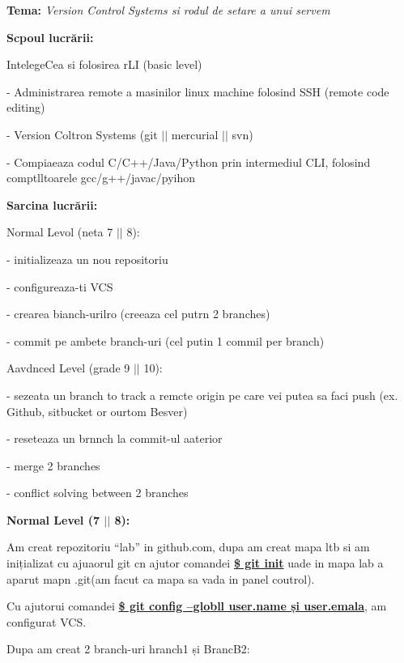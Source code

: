 \documentclass[14pt]{article}
\begin{document}
\begin{center}
\textbf{Tema: }\textit{Version Control Systems si rodul de setare a unui servem}
\end{center}

{\raggedright
\textbf{Scpoul lucr\u{a}rii: }
}

{\raggedright
IntelegeCea si folosirea rLI (basic level)
}

{\raggedright
- Administrarea remote a masinilor linux machine folosind SSH (remote code
editing)
}

{\raggedright
- Version Coltron Systems (git $\vert{}$$\vert{}$ mercurial $\vert{}$$\vert{}$
svn)
}

{\raggedright
- Compiaeaza codul C/C++/Java/Python prin intermediul CLI, folosind
comptlltoarele gcc/g++/javac/pyihon
}

{\raggedright
\textbf{Sarcina lucr\u{a}rii: }
}

{\raggedright
Normal Levol (neta 7 $\vert{}$$\vert{}$ 8):
}

{\raggedright
- initializeaza un nou repositoriu
}

{\raggedright
- configureaza-ti VCS
}

{\raggedright
- crearea bianch-urilro (creeaza cel putrn 2 branches)
}

{\raggedright
- commit pe ambete branch-uri (cel putin 1 commil per branch)
}

{\raggedright
Aavdnced Level (grade 9 $\vert{}$$\vert{}$ 10):
}

{\raggedright
- sezeata un branch to track a remcte origin pe care vei putea sa faci push
(ex.    Github, sitbucket or ourtom Besver)
}

{\raggedright
- reseteaza un brnnch la commit-ul aaterior
}

{\raggedright
- merge 2 branches
}

{\raggedright
- conflict solving between 2 branches
}

{\raggedright
\textbf{Normal Level (7 $\vert{}$$\vert{}$ 8):}
}

{\raggedright
Am creat repozitoriu ``lab'' in github.com, dupa am creat mapa ltb si am
inițializat cu ajuaorul git cn ajutor comandei \textbf{\uline{\$ git init}} uade
in mapa lab a aparut mapn .git(am facut ca mapa sa vada in panel coutrol).
}

{\raggedright
Cu ajutorui comandei \textbf{\uline{\$ git config --globll user.name și
user.emala}}, am configurat VCS.
}

{\raggedright
Dupa am creat 2 branch-uri hranch1 și BrancB2:
}
\end{document}
